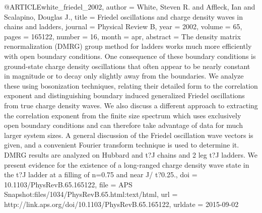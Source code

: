 @ARTICLE{white_friedel_2002,
  author = {White, Steven R. and Affleck, Ian and Scalapino, Douglas J.},
  title = {Friedel oscillations and charge density waves in chains and ladders},
  journal = {Physical Review B},
  year = {2002},
  volume = {65},
  pages = {165122},
  number = {16},
  month = apr,
  abstract = {The density matrix renormalization (DMRG) group method for ladders
	works much more efficiently with open boundary conditions. One consequence
	of these boundary conditions is ground-state charge density oscillations
	that often appear to be nearly constant in magnitude or to decay
	only slightly away from the boundaries. We analyze these using bosonization
	techniques, relating their detailed form to the correlation exponent
	and distinguishing boundary induced generalized Friedel oscillations
	from true charge density waves. We also discuss a different approach
	to extracting the correlation exponent from the finite size spectrum
	which uses exclusively open boundary conditions and can therefore
	take advantage of data for much larger system sizes. A general discussion
	of the Friedel oscillation wave vectors is given, and a convenient
	Fourier transform technique is used to determine it. DMRG results
	are analyzed on Hubbard and t?J chains and 2 leg t?J ladders. We
	present evidence for the existence of a long-ranged charge density
	wave state in the t?J ladder at a filling of n=0.75 and near J/ t?0.25.},
  doi = {10.1103/PhysRevB.65.165122},
  file = {APS Snapshot:files/1034/PhysRevB.65.html:text/html},
  url = {http://link.aps.org/doi/10.1103/PhysRevB.65.165122},
  urldate = {2015-09-02}
}

